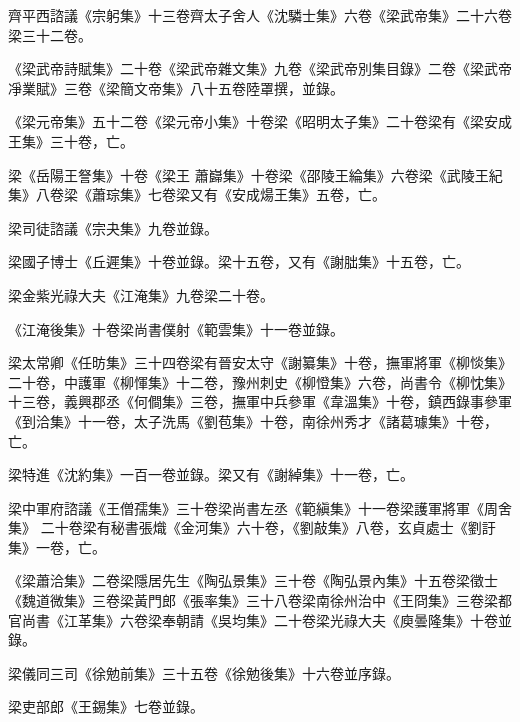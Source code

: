 \begin{pinyinscope}
 齊平西諮議《宗躬集》十三卷齊太子舍人《沈驎士集》六卷《梁武帝集》二十六卷梁三十二卷。



 《梁武帝詩賦集》二十卷《梁武帝雜文集》九卷《梁武帝別集目錄》二卷《梁武帝凈業賦》三卷《梁簡文帝集》八十五卷陸罩撰，並錄。



 《梁元帝集》五十二卷《梁元帝小集》十卷梁《昭明太子集》二十卷梁有《梁安成王集》三十卷，亡。



 梁《岳陽王詧集》十卷《梁王
 蕭巋集》十卷梁《邵陵王綸集》六卷梁《武陵王紀集》八卷梁《蕭琮集》七卷梁又有《安成煬王集》五卷，亡。



 梁司徒諮議《宗夬集》九卷並錄。



 梁國子博士《丘遲集》十卷並錄。梁十五卷，又有《謝朏集》十五卷，亡。



 梁金紫光祿大夫《江淹集》九卷梁二十卷。



 《江淹後集》十卷梁尚書僕射《範雲集》十一卷並錄。



 梁太常卿《任昉集》三十四卷梁有晉安太守《謝纂集》十卷，撫軍將軍《柳惔集》二十卷，中護軍《柳惲集》十二卷，豫州刺史《柳憕集》六卷，尚書令《柳忱集》十三卷，義興郡丞《何僴集》三卷，撫軍中兵參軍《韋溫集》十卷，鎮西錄事參軍《到洽集》十一卷，太子洗馬《劉苞集》十卷，南徐州秀才《諸葛璩集》十卷，亡。



 梁特進《沈約集》一百一卷並錄。梁又有《謝綽集》十一卷，亡。



 梁中軍府諮議《王僧孺集》三十卷梁尚書左丞《範縝集》十一卷梁護軍將軍《周舍集》
 二十卷梁有秘書張熾《金河集》六十卷，《劉敲集》八卷，玄貞處士《劉訏集》一卷，亡。



 《梁蕭洽集》二卷梁隱居先生《陶弘景集》三十卷《陶弘景內集》十五卷梁徵士《魏道微集》三卷梁黃門郎《張率集》三十八卷梁南徐州治中《王冏集》三卷梁都官尚書《江革集》六卷梁奉朝請《吳均集》二十卷梁光祿大夫《庾曇隆集》十卷並錄。



 梁儀同三司《徐勉前集》三十五卷《徐勉後集》十六卷並序錄。



 梁吏部郎《王錫集》七卷並錄。




\end{pinyinscope}
